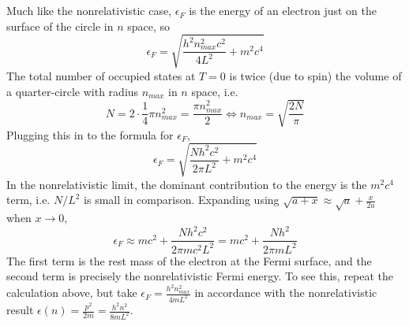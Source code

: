 \documentclass{article}
\begin{document}
\section{}
Much like the nonrelativistic case, $\epsilon_{F}$ is the energy of an electron just on the surface of the circle in $n$ space, so
\[
  \epsilon_{F}=\sqrt{\frac{h^{2}n_{max}^{2}c^{2}}{4L^{2}}+m^{2}c^{4}}
\]
The total number of occupied states at $T=0$ is twice (due to spin) the volume of a quarter-circle with radius $n_{max}$ in $n$ space, i.e.
\[
  N=2\cdot{\frac{1}{4}}\pi n_{max}^{2}=\frac{\pi n_{max}^{2}}{2}
  \Leftrightarrow n_{max}=\sqrt{\frac{2N}{\pi}}
\]
Plugging this in to the formula for $\epsilon_{F}$,
\[
  \epsilon_{F}=\sqrt{\frac{Nh^{2}c^{2}}{2\pi L^{2}}+m^{2}c^{4}}
\]
In the nonrelativistic limit, the dominant contribution to the energy is the $m^{2}c^{4}$ term, i.e. $N/L^{2}$ is small in comparison.
Expanding using $\sqrt{a+x}\approx \sqrt{a}+\frac{x}{2a}$ when $x\to 0$,
\[
  \epsilon_{F}\approx mc^{2}+\frac{Nh^{2}c^{2}}{2\pi mc^{2}L^{2}}=mc^{2}+\frac{Nh^{2}}{2\pi mL^{2}}
\]
The first term is the rest mass of the electron at the Fermi surface, and the second term is precisely the nonrelativistic Fermi energy.
To see this, repeat the calculation above, but take $\epsilon_{F}=\frac{h^{2}n_{max}^{2}}{4mL^{2}}$ in accordance with the nonrelativistic
result $\epsilon(n)=\frac{p^{2}}{2m}=\frac{h^{2}n^{2}}{8mL^{2}}$.
\end{document}
